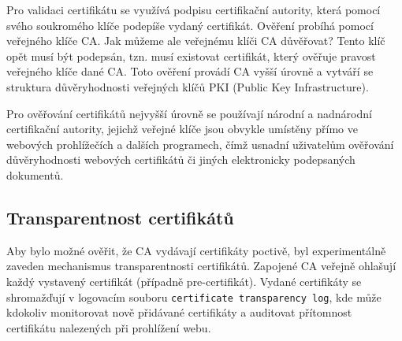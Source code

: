 Pro validaci certifikátu se využívá podpisu certifikační autority, která pomocí svého soukromého klíče podepíše vydaný certifikát. Ověření probíhá pomocí veřejného klíče CA. Jak můžeme ale veřejnému klíči CA důvěřovat? Tento klíč opět musí být podepsán, tzn. musí existovat certifikát, který ověřuje pravost veřejného klíče dané CA. Toto ověření provádí CA vyšší úrovně a vytváří se struktura důvěryhodnosti veřejných klíčů PKI (Public Key Infrastructure). 

Pro ověřování certifikátů nejvyšší úrovně se používají národní a nadnárodní certifikační autority, jejichž veřejné klíče jsou obvykle umístěny přímo ve webových prohlížečích a dalších programech, čímž usnadní uživatelům ověřování důvěryhodnosti webových certifikátů či jiných elektronicky podepsaných dokumentů. 

\subsection{Transparentnost certifikátů}
Aby bylo možné ověřit, že CA vydávají certifikáty poctivě, byl experimentálně zaveden mechanismus transparentnosti certifikátů. Zapojené CA veřejně ohlašují každý vystavený certifikát (případně pre-certifikát). Vydané certifikáty se shromažďují v logovacím souboru {\tt certificate transparency log}, kde může kdokoliv monitorovat nově
přidávané certifikáty a auditovat přítomnost certifikátu nalezených při prohlížení webu.

